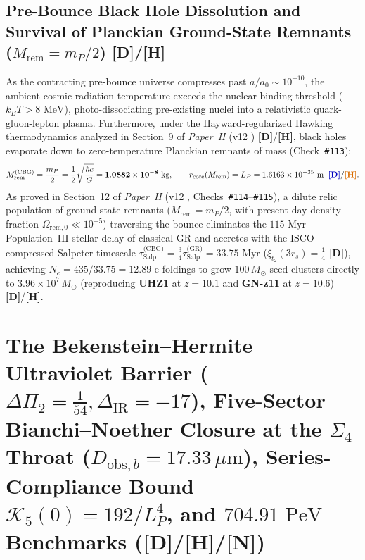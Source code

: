 \documentclass[11pt,a4paper]{article}
\newcommand{\catD}{\textbf{\textcolor{blue!75!black}{[D]}}}
\newcommand{\catH}{\textbf{\textcolor{orange!85!black}{[H]}}}
\newcommand{\catN}{\textbf{\textcolor{teal!75!black}{[N]}}}
\theoremstyle{plain}
\theoremstyle{definition}
\theoremstyle{remark}
\numberwithin{equation}{section}
\begin{document}
\subsection{\texorpdfstring{Pre-Bounce Black Hole Dissolution and Survival of Planckian Ground-State Remnants ($M_{\text{rem}} = m_P / 2$) \catD/\catH}{Pre-Bounce Black Hole Dissolution and Survival of Planckian Ground-State Remnants [D]/[H]}}

As the contracting pre-bounce universe compresses past $a / a_0 \sim 10^{-10}$, the ambient cosmic radiation temperature exceeds the nuclear binding threshold ($k_B T > 8\text{ MeV}$), photo-dissociating pre-existing nuclei into a relativistic quark-gluon-lepton plasma. Furthermore, under the Hayward-regularized Hawking thermodynamics analyzed in Section~9 of \textit{Paper~II} (v12 \cite{jimenez2026b}) \catD/\catH, black holes evaporate down to zero-temperature Planckian remnants of mass (Check~\texttt{\#113}):
\begin{equation}
M_{\text{rem}}^{\text{(CBG)}} = \frac{m_P}{2} = \frac{1}{2}\sqrt{\frac{\hbar c}{G}} = \mathbf{1.0882 \times 10^{-8}\text{ kg}}, \qquad r_{\text{core}}\!\left(M_{\text{rem}}\right) = L_P = 1.6163 \times 10^{-35}\text{ m} \;\;\catD/\catH.
\label{eq:prebounce_remnant_mass}
\end{equation}
As proved in Section~12 of \textit{Paper~II} (v12 \cite{jimenez2026b}, Checks~\texttt{\#114}--\texttt{\#115}), a dilute relic population of ground-state remnants ($M_{\text{rem}} = m_P/2$, with present-day density fraction $\Omega_{\text{rem},0} \ll 10^{-5}$) traversing the bounce eliminates the $115\text{ Myr}$ Population~III stellar delay of classical GR and accretes with the ISCO-compressed Salpeter timescale $\tau_{\text{Salp}}^{\text{(CBG)}} = \frac{3}{4}\tau_{\text{Salp}}^{\text{(GR)}} = 33.75\text{ Myr}$ ($\xi_{t_2}(3r_s) = \frac{1}{4}$ \catD), achieving $N_e = 435/33.75 = 12.89$ e-foldings to grow $100\,M_\odot$ seed clusters directly to $3.96 \times 10^7\,M_\odot$ (reproducing \textbf{UHZ1} at $z = 10.1$ and \textbf{GN-z11} at $z = 10.6$) \cite{bogdan2024,maiolino2024} \catD/\catH.

\section{\texorpdfstring{The Bekenstein--Hermite Ultraviolet Barrier ($\Delta\Pi_2 = \frac{1}{54}, \Delta_{\text{IR}} = -17$), Five-Sector Bianchi--Noether Closure at the $\Sigma_4$ Throat ($D_{\text{obs},b} = 17.33\,\mu\text{m}$), Series-Compliance Bound $\mathcal{K}_5(0) = 192/L_P^4$, and $704.91\text{ PeV}$ Benchmarks (\catD/\catH/\catN)}{The Bekenstein-Hermite Ultraviolet Barrier, Five-Sector Bianchi-Noether Closure at the Sigma_4 Throat, Series-Compliance Bound, and 704.91 PeV Benchmarks}}
\end{document}
